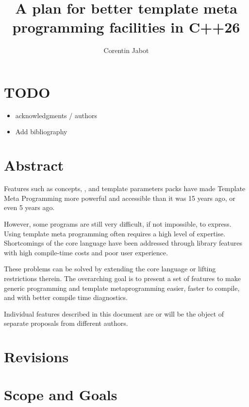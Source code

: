 \documentclass{wg21}
\title{A plan for better template meta programming facilities in C++26}
\author{Corentin Jabot}{corentin.jabot@gmail.com}
\begin{document}
\maketitle

\section{TODO}
\begin{itemize}
\item acknowledgments / authors
\item Add bibliography
\end{itemize}

\section{Abstract}

Features such as concepts, , and template parameters packs have made Template Meta Programming more powerful and accessible than it was 15 years ago, or even 5 years ago.

However, some programs are still very difficult, if not impossible, to express. Using template meta programming often requires a high level of expertise.
Shortcomings of the core language have been addressed through library features with high compile-time costs and poor user experience.

These problems can be solved by extending the core language or lifting restrictions therein.
The overarching goal is to present a set of features to make generic programming and template metaprogramming easier, faster to compile, and with better compile time diagnostics.

Individual features described in this document are or will be the object of separate proposals from different authors.



\section{Revisions}


\section{Scope and Goals}
\end{document}
